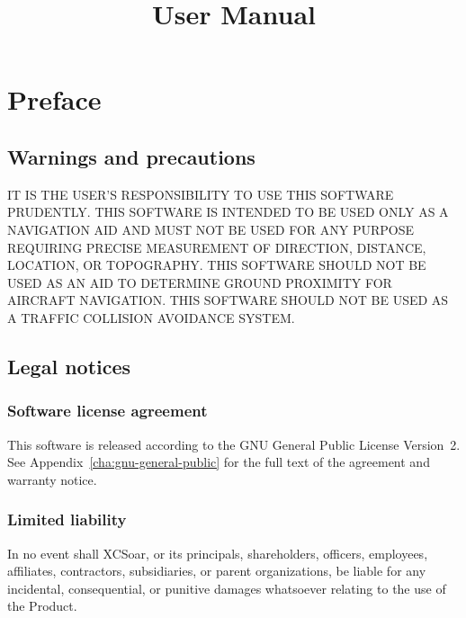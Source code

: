 \documentclass[a4paper,11pt]{refrep}
\title{User Manual}
\begin{document}
\maketitle

 
\begingroup
{}
\normalsize
{}\selectfont
\setlength{\parskip}{0.05\baselineskip}
\tableofcontents
\endgroup


\chapter*{Preface}

\section*{Warnings and precautions}

\warning IT IS THE USER'S RESPONSIBILITY TO USE THIS SOFT\-WARE PRUDENTLY. THIS SOFTWARE IS 
INTENDED TO BE USED ONLY AS A NAVIGATION AID AND MUST NOT BE USED FOR ANY PURPOSE REQUIRING 
PRECISE MEASURE\-MENT OF DIRECTION, DISTANCE, LOCATION, OR TOPO\-GRAPHY. THIS SOFTWARE SHOULD 
NOT BE USED AS AN AID TO DETERMINE GROUND PROXIMITY FOR AIRCRAFT NAVIGATION. THIS SOFTWARE 
SHOULD NOT BE USED AS A TRAFFIC COLLISION AVOIDANCE SYSTEM.



\section*{Legal notices}

\subsection*{Software license agreement}

This software is released according to the GNU General Public License
Version~2.  See Appendix~\ref{cha:gnu-general-public} for the full
text of the agreement and warranty notice.

\subsection*{Limited liability}

In no event shall XCSoar, or its principals, shareholders, officers,
employees, affiliates, contractors, subsidiaries, or parent
organizations, be liable for any incidental, consequential, or
punitive damages whatsoever relating to the use of the Product.
\end{document}

